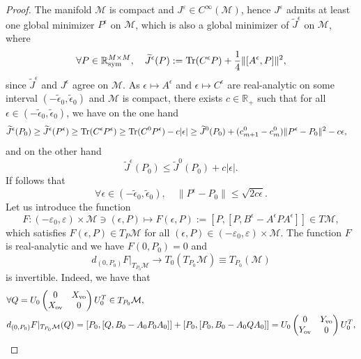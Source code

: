 \documentclass{article}
\def\R{\mathbb R}
\newcommand{\tr}{{\rm Tr}}
\newcommand{\1}{{\mathds 1}}
\begin{document}
\begin{proof} The manifold $\mathcal M$ is compact and $J^\varepsilon\in C^\infty(\mathcal M)$,
hence $J^\varepsilon$ admits at least one global minimizer $P^\epsilon$ on $\mathcal M$, which is also a global minimizer of $\widetilde J^\epsilon$ on $\mathcal M$, where
$$
\forall P \in \R^{M \times M}_{\rm sym}, \quad \widetilde J^\epsilon(P) := \tr(C^\epsilon P) + \frac 14 \|[A^\epsilon,P]\|^2,
$$
since $\widetilde J^\epsilon$ and $J^\epsilon$ agree on $\mathcal M$. As $\epsilon \mapsto A^\epsilon$  and $\epsilon \mapsto C^\epsilon$ are real-analytic on some interval $(-\widetilde \epsilon_0,\widetilde\epsilon_0)$ and $\mathcal M$ is compact, there exists $c \in \R_+$ such that for all $\epsilon \in (-\widetilde\epsilon_0,\widetilde\epsilon_0)$, we have on the one hand
\begin{align*}
\widetilde J^\epsilon(P_0) & \ge \widetilde J^\epsilon(P^\epsilon) \ge  \tr(C^\epsilon P^\epsilon) \ge \tr(C^0 P^\epsilon) - c |\epsilon|  \ge \widetilde J^0(P_0)+ (c^0_{m+1}-c^0_m) \|P^\epsilon-P_0\|^2 - c\epsilon,
\end{align*}
and on the other hand
$$
\widetilde J^\epsilon(P_0) \le \widetilde J^0(P_0) + c |\epsilon|.
$$
If follows that 
\begin{equation} \label{eq:Pepsilon-P0}
\forall \epsilon \in (-\widetilde\epsilon_0,\widetilde\epsilon_0), \quad \|P^\epsilon-P_0\| \le \sqrt{2c \epsilon}.
\end{equation}
Let us introduce the function 
\begin{equation}
F: (-\varepsilon_0,\varepsilon) \times \mathcal M \ni (\epsilon,P) \mapsto F(\epsilon,P):=[P,[P,B^\epsilon-A^\epsilon P A^\epsilon]] \in T\mathcal M,
\end{equation}
which satisfies $F(\epsilon,P) \in T_P\mathcal M$ for all  $(\epsilon,P)  \in (-\varepsilon_0,\varepsilon) \times \mathcal M$. The function $F$ is real-analytic and we have $F(0,P_0)=0$ and 
$$
d_{(0,P_0)} F|_{T_{P_0}\mathcal M} \to T_{0}(T_{P_0}\mathcal M) \equiv T_{P_0}(\mathcal M) 
$$
is invertible. Indeed, we have that
\begin{align}
&\forall Q = U_0 \begin{pmatrix} 0 & X_{\rm vo} \\ X_{\rm ov} & 0 \end{pmatrix} U_0^T \in T_{P_0}\mathcal M, \nonumber \\
& d_{(0,P_0)} F|_{T_{P_0}\mathcal M} (Q) = [P_0,[Q,B_0-A_0P_0A_0]]+[P_0,[P_0,B_0-A_0QA_0]] = U_0 \begin{pmatrix} 0 & Y_{\rm vo} \\ Y_{\rm ov} & 0 \end{pmatrix} U_0^T, \label{eq:IFT_cond}

\end{align}
\end{proof}
\end{document}
